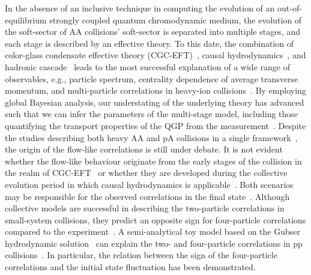 In the absence of an inclusive technique in computing the evolution of an out-of-equilibrium strongly coupled quantum chromodynamic medium, the evolution of the soft-sector of AA collisions' soft-sector is separated into multiple stages, and each stage is described by an effective theory. To this date, the combination of color-glass condensate effective theory (CGC-EFT)~\cite{Schenke:2012wb,Schenke:2012hg}, causal hydrodynamics~\cite{Kolb:2003dz,Song:2007ux,Dusling:2007gi,Holopainen:2010gz,Schenke:2010rr,Romatschke:2007mq,Niemi:2015qia,Jeon:2015dfa,Romatschke:2017ejr}, and hadronic cascade~\cite{Bass:1998ca,Bleicher:1999xi,Weil:2016zrk} leads to the most successful explanation of a wide range of observables, e.g., particle spectrum, centrality dependence of average transverse momentum, and multi-particle correlations in heavy-ion collisions~\cite{ALICE:2016kpq,Acharya:2017gsw,Acharya:2017zfg,Acharya:2020taj,ALICE:2021klf,ALICE:2021adw,ALICE:2013mez,ALICE:2011ab}. By employing global Bayesian analysis, our understating of the underlying theory has advanced such that we can infer the parameters of the multi-stage model, including those quantifying the transport properties of the QGP from the measurement~\cite{Bernhard:2016tnd,Bernhard:2019bmu,Parkkila:2021tqq,Parkkila:2021yha}. Despite the studies describing both heavy AA and pA collisions in a single framework~\cite{Moreland:2018gsh}, the origin of the flow-like correlations is still under debate. It is not evident whether the flow-like behaviour originate from the early stages of the collision in the realm of CGC-EFT~\cite{Dusling:2012cg,Bzdak:2013zma} or whether they are developed during the collective evolution period in which causal hydrodynamics is applicable~\cite{Greif:2017bnr,Mantysaari:2017cni}. Both scenarios may be responsible for the observed correlations in the final state~\cite{Greif:2017bnr}. Although collective models are successful in describing the two-particle correlations in small-system collisions, they predict an opposite sign for four-particle correlations compared to the experiment~\cite{Khachatryan:2016txc,ATLAS:2017rtr}.  A semi-analytical toy model based on the Gubser hydrodynamic solution~\cite{Gubser:2010ze,Gubser:2010ui} can explain the two- and four-particle correlations in pp collisions~\cite{Taghavi:2019mqz}. In particular, the relation between the sign of the four-particle correlations and the initial state fluctuation has been demonstrated. 


